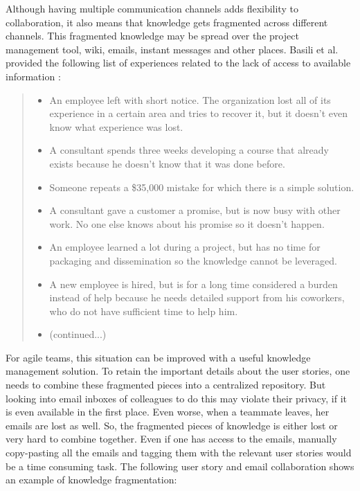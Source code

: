 Although having multiple communication channels adds flexibility to collaboration, it also means that knowledge gets fragmented across different channels. This fragmented knowledge may be spread over the project management tool, wiki, emails, instant messages and other places. Basili et al. provided the following list of experiences related to the lack of access to available information \cite{implementing_an_experience}:

\begin{quote}
\begin{itemize}
	\item An employee left with short notice. The organization lost all of its experience in a certain area and tries to recover it, but it doesn't even know what experience was lost.
	
	\item A consultant spends three weeks developing a course that already exists because he doesn't know that it was done before.
	\item Someone repeats a \$35,000 mistake for which there is a simple solution.
	\item A consultant gave a customer a promise, but is now busy with other work. No one else knows about his promise so it doesn't happen.
	\item An employee learned a lot during a project, but has no time for packaging and dissemination so the knowledge cannot be leveraged.
	\item A new employee is hired, but is for a long time considered a burden instead of help because he needs detailed support from his coworkers, who do not have sufficient time to help him.
	\item (continued...)
\end{itemize}                               
\end{quote}


For agile teams, this situation can be improved with a useful knowledge management solution. To retain the important details about the user stories, one needs to combine these fragmented pieces into a centralized repository. But looking into email inboxes of colleagues to do this may violate their privacy, if it is even available in the first place. Even worse, when a teammate leaves, her emails are lost as well. So, the fragmented pieces of knowledge is either lost or very hard to combine together. Even if one has access to the emails, manually copy-pasting all the emails and tagging them with the relevant user stories would be a time consuming task. The following user story and email collaboration shows an example of knowledge fragmentation:

